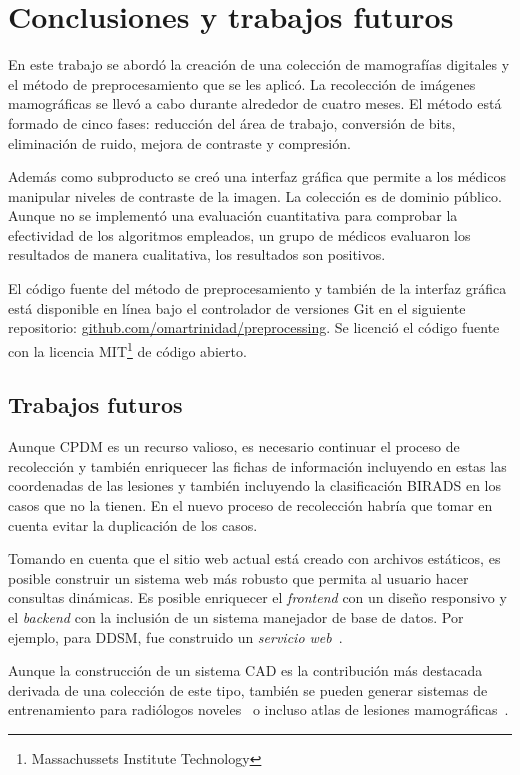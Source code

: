 \chapter{Conclusiones y trabajos futuros}
\label{conclusiones}

En este trabajo se abordó la creación de una colección de mamografías digitales
y el método de preprocesamiento que se les aplicó. La recolección de imágenes
mamográficas se llevó a cabo durante alrededor de cuatro meses. El método está
formado de cinco fases: reducción del área de trabajo, conversión de bits,
eliminación de ruido, mejora de contraste y compresión.

Además como subproducto se creó una interfaz gráfica que permite a los médicos
manipular niveles de contraste de la imagen. La colección es de dominio
público. Aunque no se implementó una evaluación cuantitativa para comprobar la
efectividad de los algoritmos empleados, un grupo de médicos evaluaron los
resultados de manera cualitativa, los resultados son positivos.

El código fuente del método de preprocesamiento y también de la interfaz
gráfica está disponible en línea bajo el controlador de versiones Git en el
siguiente repositorio: \url{github.com/omartrinidad/preprocessing}. Se licenció
el código fuente con la licencia MIT\footnote{Massachussets Institute
Technology} de código abierto.

\section{Trabajos futuros}

Aunque CPDM es un recurso valioso, es necesario continuar el proceso de
recolección y también enriquecer las fichas de información incluyendo en estas
las coordenadas de las lesiones y también incluyendo la clasificación BIRADS en
los casos que no la tienen. En el nuevo proceso de recolección habría que tomar
en cuenta evitar la duplicación de los casos.

Tomando en cuenta que el sitio web actual está creado con archivos estáticos,
es posible construir un sistema web más robusto que permita al usuario hacer
consultas dinámicas. Es posible enriquecer el \textit{frontend} con un diseño
responsivo y el \textit{backend} con la inclusión de un sistema manejador de
base de datos. Por ejemplo, para DDSM, fue construido un \textit{servicio
web}~\cite{rose2006web}.

Aunque la construcción de un sistema CAD es la contribución más destacada
derivada de una colección de este tipo, también se pueden generar sistemas de
entrenamiento para radiólogos noveles~\cite{suri2006recent} o incluso atlas de
lesiones mamográficas~\cite{antoniou2009web}.

